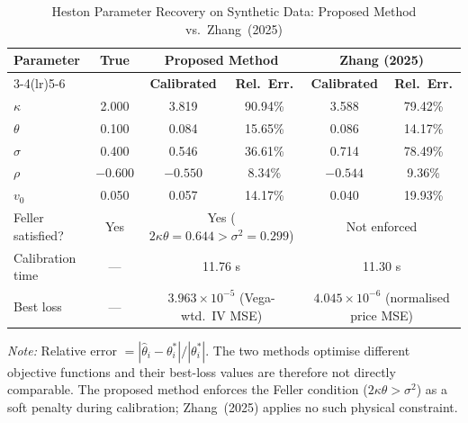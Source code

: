 \begin{table}[htbp]
  \centering
  \caption{Heston Parameter Recovery on Synthetic Data: Proposed Method vs.\ Zhang~(2025)}
  \label{tab:param_recovery}
  \setlength{\tabcolsep}{6pt}
  \begin{tabular}{lccccc}
    \toprule
    \multirow{2}{*}{\textbf{Parameter}} &
    \multirow{2}{*}{\textbf{True}} &
    \multicolumn{2}{c}{\textbf{Proposed Method}} &
    \multicolumn{2}{c}{\textbf{Zhang (2025)}} \\
    \cmidrule(lr){3-4}\cmidrule(lr){5-6}
    & & \textbf{Calibrated} & \textbf{Rel.\ Err.} & \textbf{Calibrated} & \textbf{Rel.\ Err.} \\
    \midrule
    $\kappa$  & 2.000 & 3.819 & 90.94\% & 3.588 & 79.42\% \\
    $\theta$  & 0.100 & 0.084 & 15.65\% & 0.086 & 14.17\% \\
    $\sigma$  & 0.400 & 0.546 & 36.61\% & 0.714 & 78.49\% \\
    $\rho$    & $-0.600$ & $-0.550$ & 8.34\% & $-0.544$ & 9.36\% \\
    $v_0$     & 0.050 & 0.057 & 14.17\% & 0.040 & 19.93\% \\
    \midrule
    Feller satisfied?  & Yes & \multicolumn{2}{c}{Yes ($2\kappa\theta=0.644 > \sigma^2=0.299$)} & \multicolumn{2}{c}{Not enforced} \\
    \midrule
    Calibration time   & ---  & \multicolumn{2}{c}{11.76 s} & \multicolumn{2}{c}{11.30 s} \\
    Best loss          & ---  & \multicolumn{2}{c}{$3.963\times10^{-5}$ (Vega-wtd.\ IV MSE)} & \multicolumn{2}{c}{$4.045\times10^{-6}$ (normalised price MSE)} \\
    \bottomrule
  \end{tabular}
  \begin{tablenotes}
    \small
    \item \textit{Note:} Relative error $= |\hat{\theta}_i - \theta_i^*| / |\theta_i^*|$. The two methods optimise different objective functions and their best-loss values are therefore not directly comparable. The proposed method enforces the Feller condition ($2\kappa\theta > \sigma^2$) as a soft penalty during calibration; Zhang~(2025) applies no such physical constraint.
  \end{tablenotes}
\end{table}


